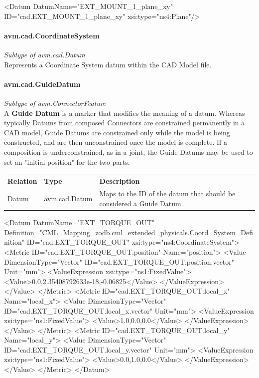 \begin{MyVerbatim}
    <Datum DatumName="EXT_MOUNT_1_plane_xy" 
      ID="cad.EXT_MOUNT_1_plane_xy" 
      xsi:type="ns4:Plane"/>
\end{MyVerbatim}

\paragraph{avm.cad.CoordinateSystem}
\textit{Subtype of avm.cad.Datum}\\
Represents a Coordinate System datum within the CAD Model file.

\paragraph{avm.cad.GuideDatum}
\textit{Subtype of avm.ConnectorFeature}\\
A \textbf{Guide Datum} is a marker that modifies the meaning of a datum. Whereas typically Datums from composed Connectors are constrained permanently in a CAD model, Guide Datums are constrained only while the model is being constructed, and are then unconstrained once the model is complete. If a composition is underconstrained, as in a joint, the Guide Datums may be used to set an "initial position" for the two parts.

\begin{tabular}{ l l p{9cm} }
\textbf{Relation} & \textbf{Type} & \textbf{Description} \\ \hline
Datum & avm.cad.Datum & Maps to the ID of the datum that should be considered a Guide Datum. \\ \hline
\end{tabular}

\begin{MyVerbatim}
    <Datum DatumName="EXT_TORQUE_OUT" 
      Definition="CML_Mapping\cml_zodb.cml_extended_physicals.Coord_System_Definition" 
      ID="cad.EXT_TORQUE_OUT" 
      xsi:type="ns4:CoordinateSystem">
      <Metric ID="cad.EXT_TORQUE_OUT.position" Name="position">
        <Value DimensionType="Vector" 
          ID="cad.EXT_TORQUE_OUT.position.vector" Unit="mm">
          <ValueExpression xsi:type="ns1:FixedValue">
            <Value>{0.0,2.35408792633e-18,-0.06825}</Value>
          </ValueExpression>
        </Value>
      </Metric>
      <Metric ID="cad.EXT_TORQUE_OUT.local_x" Name="local_x">
        <Value DimensionType="Vector" 
          ID="cad.EXT_TORQUE_OUT.local_x.vector" Unit="mm">
          <ValueExpression xsi:type="ns1:FixedValue">
            <Value>{1.0,0.0,0.0}</Value>
          </ValueExpression>
        </Value>
      </Metric>
      <Metric ID="cad.EXT_TORQUE_OUT.local_y" Name="local_y">
        <Value DimensionType="Vector" 
          ID="cad.EXT_TORQUE_OUT.local_y.vector" Unit="mm">
          <ValueExpression xsi:type="ns1:FixedValue">
            <Value>{0.0,1.0,0.0}</Value>
          </ValueExpression>
        </Value>
      </Metric>
    </Datum>
\end{MyVerbatim}

